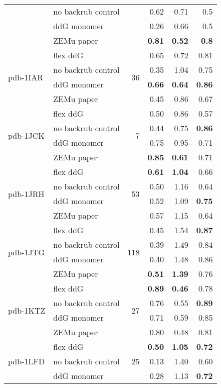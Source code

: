 \begin{longtable}{llrrrr}
 & no backrub control & & 0.62 & 0.71 & 0.5  \\
 & ddG monomer & & 0.26 & 0.66 & 0.5  \\
 & ZEMu paper & & \textbf{0.81} & \textbf{0.52} & \textbf{0.8}  \\
\hline
 \multirow{ 4}{*}{pdb-1IAR} & flex ddG & \multirow{ 4}{*}{36} & 0.65 & 0.72 & 0.81  \\
 & no backrub control & & 0.35 & 1.04 & 0.75  \\
 & ddG monomer & & \textbf{0.66} & \textbf{0.64} & \textbf{0.86}  \\
 & ZEMu paper & & 0.45 & 0.86 & 0.67  \\
\hline
 \multirow{ 4}{*}{pdb-1JCK} & flex ddG & \multirow{ 4}{*}{7} & 0.50 & 0.86 & 0.57  \\
 & no backrub control & & 0.44 & 0.75 & \textbf{0.86}  \\
 & ddG monomer & & 0.75 & 0.95 & 0.71  \\
 & ZEMu paper & & \textbf{0.85} & \textbf{0.61} & 0.71  \\
\hline
 \multirow{ 4}{*}{pdb-1JRH} & flex ddG & \multirow{ 4}{*}{53} & \textbf{0.61} & \textbf{1.04} & 0.66  \\
 & no backrub control & & 0.50 & 1.16 & 0.64  \\
 & ddG monomer & & 0.52 & 1.09 & \textbf{0.75}  \\
 & ZEMu paper & & 0.57 & 1.15 & 0.64  \\
\hline
 \multirow{ 4}{*}{pdb-1JTG} & flex ddG & \multirow{ 4}{*}{118} & 0.45 & 1.54 & \textbf{0.87}  \\
 & no backrub control & & 0.39 & 1.49 & 0.84  \\
 & ddG monomer & & 0.40 & 1.48 & 0.86  \\
 & ZEMu paper & & \textbf{0.51} & \textbf{1.39} & 0.76  \\
\hline
 \multirow{ 4}{*}{pdb-1KTZ} & flex ddG & \multirow{ 4}{*}{27} & \textbf{0.89} & \textbf{0.46} & 0.78  \\
 & no backrub control & & 0.76 & 0.55 & \textbf{0.89}  \\
 & ddG monomer & & 0.71 & 0.59 & 0.85  \\
 & ZEMu paper & & 0.80 & 0.48 & 0.81  \\
\hline
 \multirow{ 4}{*}{pdb-1LFD} & flex ddG & \multirow{ 4}{*}{25} & \textbf{0.50} & \textbf{1.05} & \textbf{0.72}  \\
 & no backrub control & & 0.13 & 1.40 & 0.60  \\
 & ddG monomer & & 0.28 & 1.13 & \textbf{0.72}  \\

\end{longtable}

